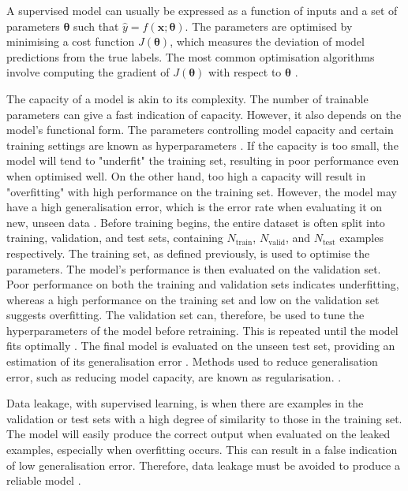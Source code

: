 \documentclass[12pt]{article}
\begin{document}
A supervised model can usually be expressed as a function of inputs and a set of parameters $\bm\theta$ such that $\hat{y}=f(\bm{x};\bm\theta)$. The parameters are optimised by minimising a cost function $J(\bm\theta)$, which measures the deviation of model predictions from the true labels. The most common optimisation algorithms involve computing the gradient of $J(\bm\theta)$ with respect to $\bm\theta$ \cite{Goodfellow16}. 

The capacity of a model is akin to its complexity. The number of trainable parameters can give a fast indication of capacity. However, it also depends on the model's functional form. The parameters controlling model capacity and certain training settings are known as hyperparameters \cite{Goodfellow16}. If the capacity is too small, the model will tend to "underfit" the training set, resulting in poor performance even when optimised well. On the other hand, too high a capacity will result in "overfitting" with high performance on the training set. However, the model may have a high generalisation error, which is the error rate when evaluating it on new, unseen data \cite{Murphy12, Goodfellow16}. Before training begins, the entire dataset is often split into training, validation, and test sets, containing $N_{\mathrm{train}}$, $N_{\mathrm{valid}}$, and $N_{\mathrm{test}}$ examples respectively. The training set, as defined previously, is used to optimise the parameters. The model's performance is then evaluated on the validation set. Poor performance on both the training and validation sets indicates underfitting, whereas a high performance on the training set and low on the validation set suggests overfitting. The validation set can, therefore, be used to tune the hyperparameters of the model before retraining. This is repeated until the model fits optimally \cite{Murphy12, Goodfellow16}. The final model is evaluated on the unseen test set, providing an estimation of its generalisation error \cite{Murphy12}. Methods used to reduce generalisation error, such as reducing model capacity, are known as regularisation. \cite{Goodfellow16}.

Data leakage, with supervised learning, is when there are examples in the validation or test sets with a high degree of similarity to those in the training set. The model will easily produce the correct output when evaluated on the leaked examples, especially when overfitting occurs. This can result in a false indication of low generalisation error. Therefore, data leakage must be avoided to produce a reliable model \cite{Kaufman12}.
\end{document}

